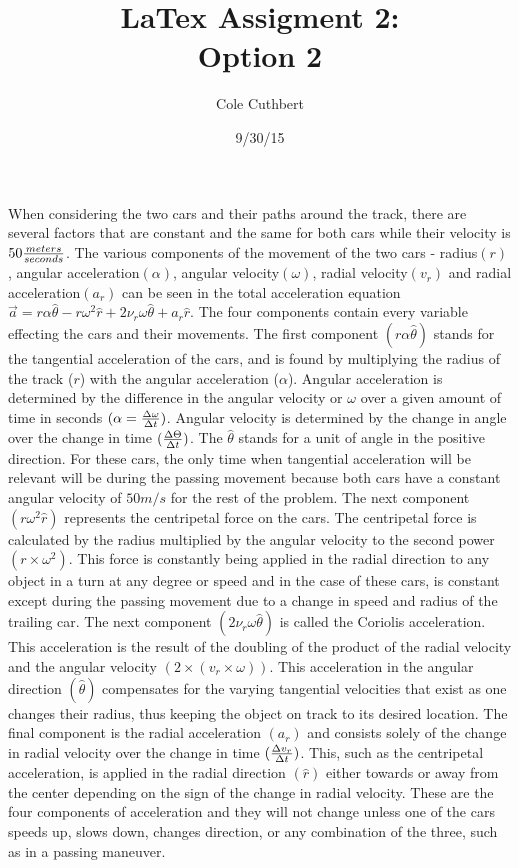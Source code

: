 \documentclass[12pt,a4paper]{article}%
\title{LaTex Assigment 2: \\Option 2}
\author{Cole Cuthbert}
\date{9/30/15} %
\begin{document}
\maketitle

	When considering the two cars and their paths around the track, there are several factors that are constant and the same for both cars while their velocity is $50{{meters}\over{seconds}}$. The various components of the movement of the two cars - radius$(r)$, angular acceleration$(\alpha)$, angular velocity$({\omega})$, radial velocity$(v_r)$ and radial acceleration$(a_r)$ can be seen in the total acceleration equation ${\vec{a}}={{r}{\alpha}{\hat{\theta}}-{r}{\omega^2}{\hat{r}}+{2}{\nu_r}{\omega}{\hat\theta}+{a_r}{\hat{r}}}$. The four components contain every variable effecting the cars and their movements. The first component $({r}{\alpha}{\hat{\theta}})$ stands for the tangential acceleration of the cars, and is found by multiplying the radius of the track ($r$) with the angular acceleration ($\alpha$). Angular acceleration is determined by the difference in the angular velocity or $\omega$ over a given amount of time in seconds $({{\alpha}={{\Delta\omega}\over{\Delta}{t}}})$. Angular velocity is determined by the change in angle over the change in time $({{\Delta}{\Theta}\over{\Delta}{t}})$. The ${\hat\theta}$ stands for a unit of angle in the positive direction. For these cars, the only time when tangential acceleration will be relevant will be during the passing movement because both cars have a constant angular velocity of $50m/s$ for the rest of the problem. The next component $({r}{\omega^2}{\hat{r}})$ represents the centripetal force on the cars. The centripetal force is calculated by the radius multiplied by the angular velocity to the second power $(r\times\omega^2)$. This force is constantly being applied in the radial direction to any object in a turn at any degree or speed and in the case of these cars, is constant except during the passing movement due to a change in speed and radius of the trailing car. The next component $({2}{\nu_r}{\omega}{\hat\theta})$ is called the Coriolis acceleration. This acceleration is the result of the doubling of the product of the radial velocity and the angular velocity $(2\times({v_r}\times{\omega}))$. This acceleration in the angular direction $(\hat\theta)$ compensates for the varying tangential velocities that exist as one changes their radius, thus keeping the object on track to its desired location. The final component is the radial acceleration $({a_r})$ and consists solely of the change in radial velocity over the change in time $({{\Delta{v_r}}\over{\Delta{t}}})$. This, such as the centripetal acceleration, is applied in the radial direction $(\hat{r})$ either towards or away from the center depending on the sign of the change in radial velocity. These are the four components of acceleration and they will not change unless one of the cars speeds up, slows down, changes direction, or any combination of the three, such as in a passing maneuver.
	
\end{document}

